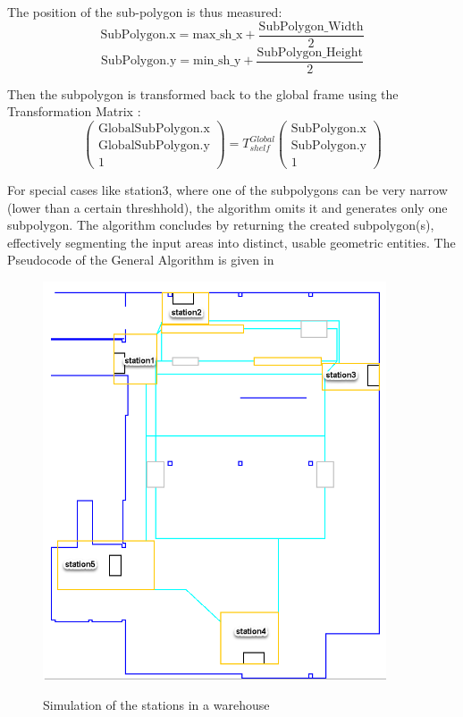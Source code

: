 The position of the sub-polygon is thus measured:
\begin{equation}
\text{SubPolygon.x} = \text{max\_sh\_x} + \frac{\text{SubPolygon\_Width}}{2}
\end{equation}
\begin{equation}
\text{SubPolygon.y} = \text{min\_sh\_y} + \frac{\text{SubPolygon\_Height}}{2}
\end{equation}

Then the subpolygon is transformed back to the global frame using the Transformation 
Matrix :
\begin{equation}
\begin{pmatrix}
\text{GlobalSubPolygon.x} \\
\text{GlobalSubPolygon.y} \\
1
\end{pmatrix}
=
T_{shelf}^{Global}
\begin{pmatrix}
\text{SubPolygon.x} \\
\text{SubPolygon.y} \\
1
\end{pmatrix}
\end{equation}

For special cases like station3, where one of the subpolygons can be very narrow (lower than a 
certain threshhold), the algorithm omits it and generates only one subpolygon. 
The algorithm concludes by returning the created subpolygon(s), effectively segmenting the 
input areas into distinct, usable geometric entities.
The Pseudocode of the General Algorithm is given in 


\begin{figure}[H]
    \begin{center}
        \includegraphics[width=4in]{images/Chap2/warehouse.png}\\
        \caption{Simulation of the stations in a warehouse}
        \label{warehouse}
        \end{center}    
\end{figure}



